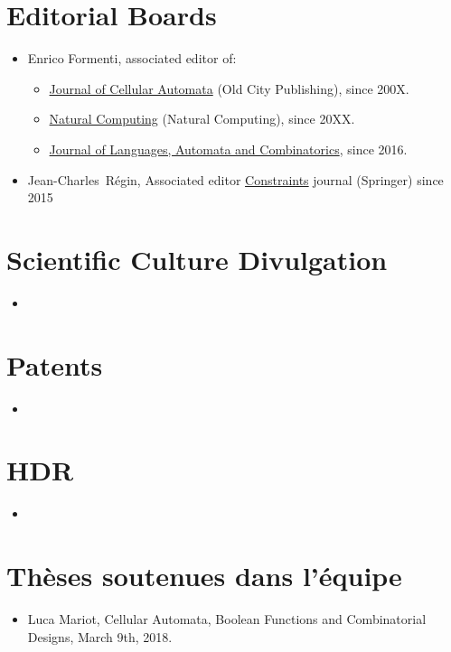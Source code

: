 \documentclass[a4paper]{article}
\newcommand{\nome}[1]{#1}
\newcommand{\cognome}[1]{#1}
\newcommand{\person}[2]{\nome{#1}\ \cognome{#2}\xspace}
\newcommand{\JCR}{\person{Jean-Charles}{Régin}}
\begin{document}
\section{Editorial Boards}
\begin{itemize}

 \item Enrico Formenti, associated editor of:
 \begin{itemize}
 \item \href{http://www.oldcitypublishing.com/journals/jca-home/}{Journal of Cellular Automata} (Old City Publishing), since 200X.
 \item \href{http://www.springer.com/computer/theoretical+computer+science/journal/11047}{Natural Computing} (Natural Computing), since 20XX.
 \item \href{http://www.jalc.de}{Journal of Languages, Automata and Combinatorics}, since 2016.
 \end{itemize}
 \item \JCR, Associated editor \href{https://link.springer.com/journal/10601}{Constraints} journal (Springer) since 2015
\end{itemize}

\section{Scientific Culture Divulgation}
\begin{itemize}
\item 
\end{itemize}

\section{Patents}
\begin{itemize}
 \item
\end{itemize}

\section{HDR}
\begin{itemize}
 \item
\end{itemize}

\section{Thèses soutenues dans l'équipe}
\begin{itemize}
 \item Luca Mariot, Cellular Automata, Boolean Functions and Combinatorial Designs, March 9th, 2018.
\end{itemize}
\end{document}
